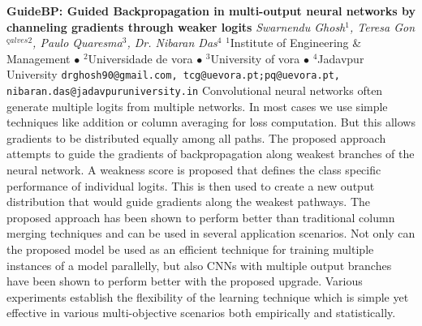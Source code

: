 
    \begin{conf-abstract}[]
        {\textbf{GuideBP: Guided Backpropagation in multi-output neural networks by channeling gradients through weaker logits}}
        {\textit{Swarnendu Ghosh$^{1}$, Teresa Gon$^{çalves2}$, Paulo Quaresma$^{3}$, Dr. Nibaran Das$^{4}$}}
        {$^{1}$Institute of Engineering \& Management $\bullet$ $^{2}$Universidade de vora $\bullet$ $^{3}$University of vora $\bullet$ $^{4}$Jadavpur University}
        {\texttt{drghosh90@gmail.com, tcg@uevora.pt;pq@uevora.pt, nibaran.das@jadavpuruniversity.in}}
        {Convolutional neural networks often generate multiple logits from multiple networks. In most cases we use simple techniques like addition or column averaging for loss computation. But this allows gradients to be distributed equally among all paths. The proposed approach attempts to guide the gradients of backpropagation along weakest branches of the neural network. A weakness score is proposed that defines the class specific performance of individual logits. This is then used to create a new output distribution that would guide gradients along the weakest pathways. The proposed approach has been shown to perform better than traditional column merging techniques and can be used in several application scenarios. Not only can the proposed model be used as an efficient technique for training multiple instances of a model parallelly, but also CNNs with multiple output branches have been shown to perform better with the proposed upgrade. Various experiments establish the flexibility of the learning technique which is simple yet effective in various multi-objective scenarios both empirically and statistically.}
    \end{conf-abstract}
        